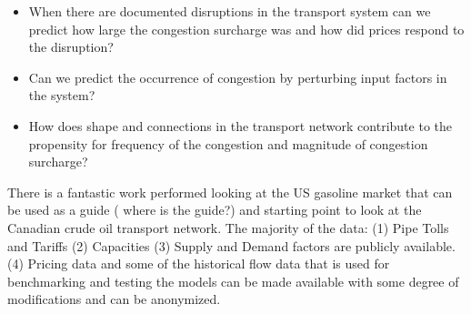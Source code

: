 \documentclass[11pt, letterpaper,nounbold]{article}
\begin{document}
\begin{itemize}
	\item When there are documented disruptions in the transport system can we predict how large the congestion surcharge was and how did prices respond to the disruption?
	\item Can we predict the occurrence of congestion by perturbing input factors in the system?
	\item How does shape and connections in the transport network contribute to the propensity for frequency of the congestion and magnitude of congestion surcharge?
\end{itemize}


There is a fantastic work performed looking at the US gasoline market that can be used as a guide ({\color{red} where is the guide?}) and starting point to look at the Canadian crude oil transport network.
The majority of the data: (1) Pipe Tolls and Tariffs (2) Capacities (3) Supply and Demand factors are publicly available. (4) Pricing data and some of the historical flow data that is used for benchmarking and testing the models can be made available with some degree of modifications and can be anonymized.      
\end{document}
